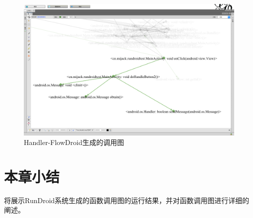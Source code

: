 \begin{figure}[ht]
	\centering
	\includegraphics[width=\textwidth]{./Figures/FlowDroid-handler.png}
	\caption{Handler-FlowDroid生成的调用图}
	\label{fig:flowdroid-result-handler}
\end{figure}
 \section{本章小结}
 
 将展示RunDroid系统生成的函数调用图的运行结果，并对函数调用图进行详细的阐述。
